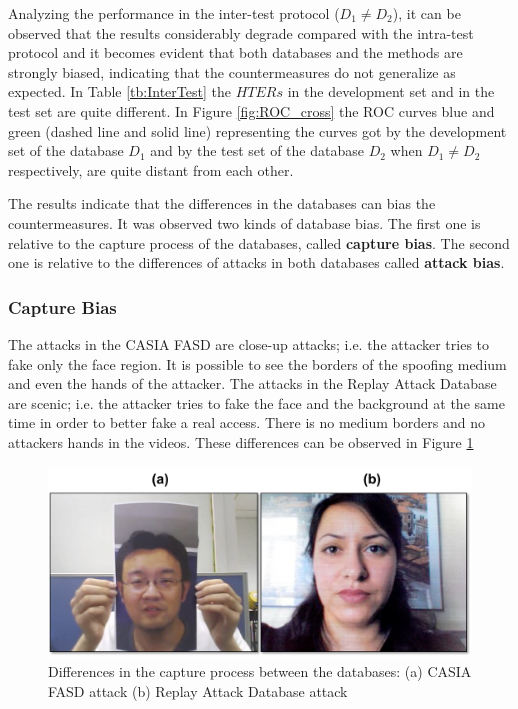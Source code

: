 Analyzing the performance in the inter-test protocol ($D_1 \neq D_2$), it can be observed that the results considerably degrade compared with the intra-test protocol and it becomes evident that both databases and the methods are strongly biased, indicating that the countermeasures do not generalize as expected. In Table \ref{tb:InterTest} the $HTERs$ in the development set and in the test set are quite different. In Figure \ref{fig:ROC_cross} the ROC curves blue and green (dashed line and solid line) representing the curves got by the development set of the database $D_1$ and by the test set of the database $D_2$ when $D_1 \neq D_2$ respectively, are quite distant from each other. 


The results indicate that the differences in the databases can bias the countermeasures. It was observed two kinds of database bias. The first one is relative to the capture process of the databases, called \textbf{capture bias}. The second one is relative to the differences of attacks in both databases called \textbf{attack bias}.

\subsubsection{Capture Bias}

The attacks in the CASIA FASD are close-up attacks; i.e. the attacker tries to fake only the face region. It is possible to see the borders of the spoofing medium and even the hands of the attacker. The attacks in the Replay Attack Database are scenic; i.e. the attacker tries to fake the face and the background at the same time in order to better fake a real access. There is no medium borders and no attackers hands in the videos. These differences can be observed in Figure \ref{fig:database_differences} 

\begin{figure}[!btb]
\begin{center}
\includegraphics [width=12cm] {images/casia_replay_differenes.pdf}
\caption[Differences in the capture process between the databases]{Differences in the capture process between the databases: (a) CASIA FASD attack (b) Replay Attack Database attack } 
\label{fig:database_differences}
\end{center}
\end{figure}

